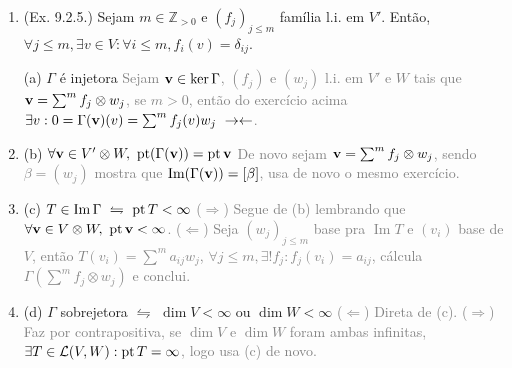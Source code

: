 \begin{enumerate}[label = , left = 0.5cm ]
    \item \vspace{-1.3cm} \begin{lemma}
        (\textcolor{rojoscuro}{Ex. 9.2.5.}) Sejam \(m \in \mathbb{Z}_{>0}\) e \((f_j)_{j\leq m}\) família l.i. em \(V'\). Então, \(\forall j\leq m, \exists v \in V : \forall i\leq m, f_i(v) = \delta_{ij}\). 
    \end{lemma}
    \begin{tcolorbox}[colframe=gray, colback=white, boxrule=0.8pt]
        \centering (a) \(\Gamma \) é injetora 
        \tcblower
        \textcolor{gray}{
            Sejam \(\textbf{v} \in \ker \Gamma \),  \((f_j)\) e \( (w_j)\) l.i. em \(V'\) e \(W\) tais que \(\textbf{v} = \sum^m f_j \otimes w_j\), se \(m>0\), então do exercício acima \(\exists v: 0 = \Gamma (\textbf{v})(v) = \sum^m f_j(v)w_j \ \rightarrow \leftarrow\).
        }
    \end{tcolorbox}
    \item \begin{tcolorbox}[colframe=gray, colback=white, boxrule=0.8pt]
        \centering (b) \(\forall \textbf{v} \in V' \otimes W, \ \operatorname{pt} (\Gamma(\textbf{v})) = \operatorname{pt} \textbf{v}\)
        \tcblower
        \textcolor{gray}{
            De novo sejam \(\textbf{v} = \sum^m f_j \otimes w_j\), sendo \(\beta = (w_j)\) mostra que \(\operatorname{Im(\Gamma(\textbf{v})) } = [\beta]\), usa de novo o mesmo exercício. 
        }
    \end{tcolorbox}
    \item \begin{tcolorbox}[colframe=gray, colback=white, boxrule=0.8pt]
        \centering (c) \(T \in \operatorname{Im}\Gamma \ \leftrightharpoons \ \pt T < \infty\)
        \tcblower
        \textcolor{gray}{
            (\(\Rightarrow \)) Segue de (b) lembrando que \(\forall \textbf{v} \in V\otimes W, \ \operatorname{pt} \textbf{v} < \infty\). (\(\Leftarrow\)) Seja \((w_j)_{j\leq m} \) base pra \(\operatorname{Im}T\) e \((v_i)\) base de \(V\), então \(T(v_i) = \sum^m a_{ij} w_j\), \(\forall j\leq m, \exists !f_j: f_j(v_i) = a_{ij} \), cálcula \(\Gamma\left(\sum^m f_j \otimes w_j\right)\) e conclui.  
        }
    \end{tcolorbox}
    \item \begin{tcolorbox}[colframe=gray, colback=white, boxrule=0.8pt]
        \centering (d) \(\Gamma \) sobrejetora  \(\leftrightharpoons \)  \(\dim V  < \infty\) ou \(\dim W < \infty \)
        \tcblower
        \textcolor{gray}{
            (\(\Leftarrow \)) Direta de (c). (\(\Rightarrow\)) Faz por contrapositiva, se \(\dim V \) e \(\dim W\) foram ambas infinitas, \(\exists T \in \mathcal{L}(V,W): \operatorname{pt} T = \infty\), logo usa (c) de novo.   
        }
    \end{tcolorbox}
\end{enumerate}

